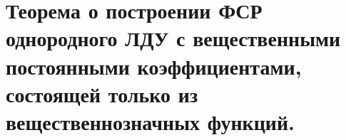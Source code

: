 {
	\section{Теорема о построении ФСР однородного ЛДУ с вещественными постоянными коэффициентами, состоящей
	только из вещественнозначных функций.}

	\newpage
}